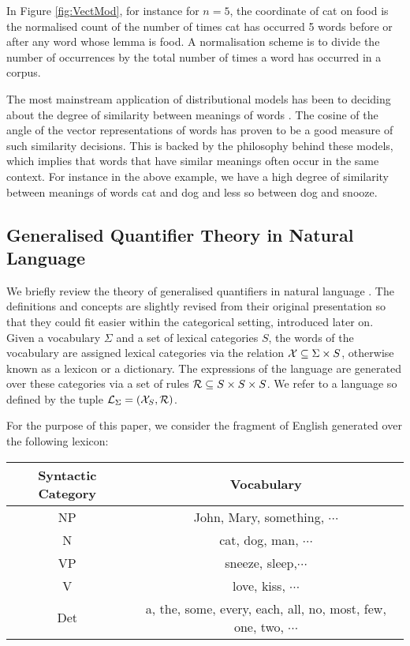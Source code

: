 In Figure \ref{fig:VectMod}, for instance for $n=5$, the coordinate of cat on food is the normalised count of the number of times cat has occurred 5 words before or after any  word whose lemma is food. A normalisation scheme is to divide the number of occurrences by the total number of times a word has occurred in a corpus. 



The most mainstream  application of distributional models has been to deciding about the degree of similarity between meanings  of words \cite{Curran}. The cosine of the angle of the vector representations of words has proven to be a good measure of such similarity decisions. This is backed by the  philosophy behind these models, which implies that words that have similar meanings often occur in the same context. 
For instance in the above example, we have a high degree of similarity between meanings of words  cat and dog and less so between dog and snooze. 



\subsection{Generalised Quantifier Theory in Natural Language}
\label{GenQuant}

We briefly review the theory of generalised quantifiers in natural language \cite{BarwiseCooper81}.   The definitions and concepts are slightly revised from their original presentation so that they could fit easier  within the categorical setting, introduced later on. 
Given  a vocabulary $\Sigma$ and a set of lexical categories $S$, the words of the vocabulary are assigned lexical categories via the relation ${\cal X} \subseteq \Sigma \times S$, otherwise known as a lexicon or a dictionary.  The expressions of the language are generated over these categories via a  set of  rules ${\cal R} \subseteq S \times S \times S$.  We refer to a language so defined  by the tuple ${\cal L}_{\Sigma} = ({\cal X}_S, {\cal R})$. 


For the purpose of this paper, we consider the fragment of English generated over the following lexicon:

\begin{center}
\begin{tabular}{c|c}
Syntactic Category & Vocabulary\\
\hline
NP &  John, Mary, something, $\cdots$\\
N&   cat, dog, man, $\cdots$\\
VP &  sneeze, sleep,$\cdots$\\
V &   love, kiss, $\cdots$\\
Det &  a, the, some, every, each, all, no, most, few, one, two, $\cdots$ 
\end{tabular}
\end{center}


